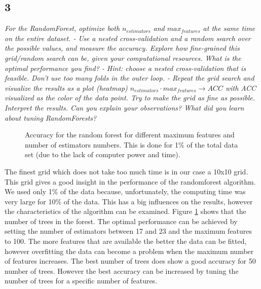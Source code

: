 \documentclass[a4paper,12pt]{article}
\begin{document}
{\subsection{3}
{\it For the RandomForest, optimize both $n_{estimators}$ and $max_{features}$ at the same time on the entire dataset. - Use a nested cross-validation and a random search over the possible values, and measure the accuracy. Explore how fine-grained this grid/random search can be, given your computational resources. What is the optimal performance you find? - Hint: choose a nested cross-validation that is feasible. Don’t use too many folds in the outer loop. - Repeat the grid search and visualize the results as a plot (heatmap) $n_{estimators}\cdot max_{features} \rightarrow ACC$ with ACC visualized as the color of the data point. Try to make the grid as fine as possible. Interpret the results. Can you explain your observations? What did you learn about tuning RandomForests?}
\begin{figure}[H]
\hfill
{}
\hfill
\caption{Accuracy for the random forest for different maximum features and number of estimators numbers. This is done for 1\% of the total data set (due to the lack of computer power and time).}
\label{Q23}
\end{figure}
\textnormal{The finest grid which does not take too much time is in our case a 10x10 grid. This grid gives a good insight in the performance of the randomforest algorithm. We used only 1\% of the data because, unfortunately, the computing time was very large for 10\% of the data. This has a big influences on the results, however the characteristics of the algorithm can be examined. Figure \ref{Q23} shows that the number of trees in the forest. The optimal performance can be achieved by setting the number of estimators between 17 and 23 and the maximum features to 100. The more features that are available the better the data can be fitted, however overfitting the data can become a problem when the maximum number of features increases. The best number of trees does show a good accuracy for 50 number of trees. However the best accuracy can be increased by tuning the number of trees for a specific number of features.} 

}
\end{document}
